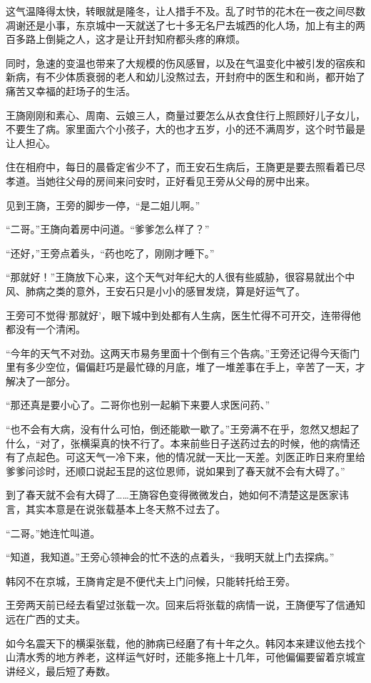 这气温降得太快，转眼就是隆冬，让人措手不及。乱了时节的花木在一夜之间尽数凋谢还是小事，东京城中一天就送了七十多无名尸去城西的化人场，加上有主的两百多路上倒毙之人，这才是让开封知府都头疼的麻烦。

同时，急速的变温也带来了大规模的伤风感冒，以及在气温变化中被引发的宿疾和新病，有不少体质衰弱的老人和幼儿没熬过去，开封府中的医生和和尚，都开始了痛苦又幸福的赶场子的生活。

王旖刚刚和素心、周南、云娘三人，商量过要怎么从衣食住行上照顾好儿子女儿，不要生了病。家里面六个小孩子，大的也才五岁，小的还不满周岁，这个时节最是让人担心。

住在相府中，每日的晨昏定省少不了，而王安石生病后，王旖更是要去照看着已尽孝道。当她往父母的房间来问安时，正好看见王旁从父母的房中出来。

见到王旖，王旁的脚步一停，“是二姐儿啊。”

“二哥。”王旖向着房中问道。“爹爹怎么样了？”

“还好，”王旁点着头，“药也吃了，刚刚才睡下。”

“那就好！”王旖放下心来，这个天气对年纪大的人很有些威胁，很容易就出个中风、肺病之类的意外，王安石只是小小的感冒发烧，算是好运气了。

王旁可不觉得‘那就好’，眼下城中到处都有人生病，医生忙得不可开交，连带得他都没有一个清闲。

“今年的天气不对劲。这两天市易务里面十个倒有三个告病。”王旁还记得今天衙门里有多少空位，偏偏赶巧是最忙碌的月底，堆了一堆差事在手上，辛苦了一天，才解决了一部分。

“那还真是要小心了。二哥你也别一起躺下来要人求医问药、”

“也不会有大病，没有什么可怕，倒还能歇一歇了。”王旁满不在乎，忽然又想起了什么，“对了，张横渠真的快不行了。本来前些日子送药过去的时候，他的病情还有了点起色。可这天气一冷下来，他的情况就一天比一天差。刘医正昨日来府里给爹爹问诊时，还顺口说起玉昆的这位恩师，说如果到了春天就不会有大碍了。”

到了春天就不会有大碍了……王旖容色变得微微发白，她如何不清楚这是医家讳言，其实本意是在说张载基本上冬天熬不过去了。

“二哥。”她连忙叫道。

“知道，我知道。”王旁心领神会的忙不迭的点着头，“我明天就上门去探病。”

韩冈不在京城，王旖肯定是不便代夫上门问候，只能转托给王旁。

王旁两天前已经去看望过张载一次。回来后将张载的病情一说，王旖便写了信通知远在广西的丈夫。

如今名震天下的横渠张载，他的肺病已经磨了有十年之久。韩冈本来建议他去找个山清水秀的地方养老，这样运气好时，还能多拖上十几年，可他偏偏要留着京城宣讲经义，最后短了寿数。

